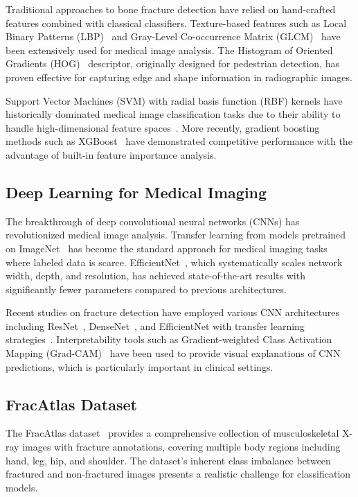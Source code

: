 \documentclass[conference]{IEEEtran}
\begin{document}
Traditional approaches to bone fracture detection have relied on hand-crafted features combined with classical classifiers. Texture-based features such as Local Binary Patterns (LBP)~\cite{ojala2002} and Gray-Level Co-occurrence Matrix (GLCM)~\cite{haralick1973} have been extensively used for medical image analysis. The Histogram of Oriented Gradients (HOG)~\cite{dalal2005} descriptor, originally designed for pedestrian detection, has proven effective for capturing edge and shape information in radiographic images.

Support Vector Machines (SVM) with radial basis function (RBF) kernels have historically dominated medical image classification tasks due to their ability to handle high-dimensional feature spaces~\cite{cortes1995}. More recently, gradient boosting methods such as XGBoost~\cite{chen2016} have demonstrated competitive performance with the advantage of built-in feature importance analysis.

\subsection{Deep Learning for Medical Imaging}

The breakthrough of deep convolutional neural networks (CNNs) has revolutionized medical image analysis. Transfer learning from models pretrained on ImageNet~\cite{deng2009} has become the standard approach for medical imaging tasks where labeled data is scarce. EfficientNet~\cite{tan2019}, which systematically scales network width, depth, and resolution, has achieved state-of-the-art results with significantly fewer parameters compared to previous architectures.

Recent studies on fracture detection have employed various CNN architectures including ResNet~\cite{he2016}, DenseNet~\cite{huang2017}, and EfficientNet with transfer learning strategies~\cite{rajpurkar2017}. Interpretability tools such as Gradient-weighted Class Activation Mapping (Grad-CAM)~\cite{selvaraju2017} have been used to provide visual explanations of CNN predictions, which is particularly important in clinical settings.

\subsection{FracAtlas Dataset}

The FracAtlas dataset~\cite{abedeen2023} provides a comprehensive collection of musculoskeletal X-ray images with fracture annotations, covering multiple body regions including hand, leg, hip, and shoulder. The dataset's inherent class imbalance between fractured and non-fractured images presents a realistic challenge for classification models.
\end{document}
